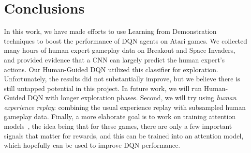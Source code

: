 \documentclass[letterpaper, 10pt, conference]{ieeeconf}
\begin{document}
\section{Conclusions}\label{sec:conclusions}

In this work, we have made efforts to use Learning from Demonstration techniques
to boost the performance of DQN agents on Atari games. We collected many hours
of human expert gameplay data on Breakout and Space Invaders, and provided
evidence that a CNN can largely predict the human expert's actions. Our
Human-Guided DQN utilized this classifier for exploration. Unfortunately, the
results did not substantially improve, but we believe there is still untapped
potential in this project. In future work, we will run Human-Guided DQN with
longer exploration phases. Second, we will try using \emph{human experience
replay}: combining the usual experience replay with subsampled human gameplay
data. Finally, a more elaborate goal is to work on training attention
models~\cite{NIPS2014_5542,icml2015_xuc15}, the idea being that for these games,
there are only a few important signals that matter for rewards, and this can be
trained into an attention model, which hopefully can be used to improve DQN
performance.



\end{document}
